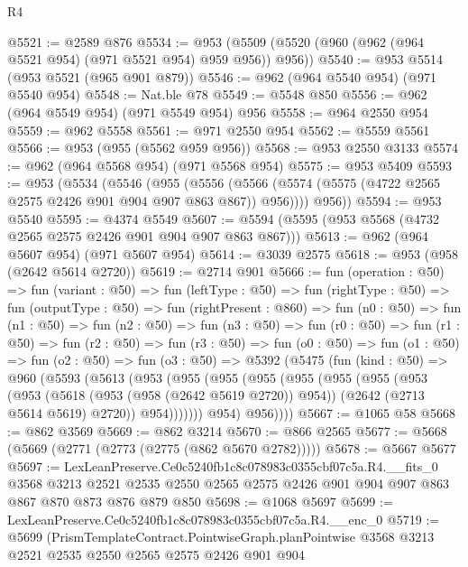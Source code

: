 \begin{lexlean}{R4}
\begin{coremodule}
@5521 := @2589 @876
@5534 := @953 (@5509 (@5520 (@960 (@962 (@964 @5521 @954) (@971 @5521 @954) @959 @956)) @956))
@5540 := @953 @5514 (@953 @5521 (@965 @901 @879))
@5546 := @962 (@964 @5540 @954) (@971 @5540 @954)
@5548 := Nat.ble @78
@5549 := @5548 @850
@5556 := @962 (@964 @5549 @954) (@971 @5549 @954) @956
@5558 := @964 @2550 @954
@5559 := @962 @5558
@5561 := @971 @2550 @954
@5562 := @5559 @5561
@5566 := @953 (@955 (@5562 @959 @956))
@5568 := @953 @2550 @3133
@5574 := @962 (@964 @5568 @954) (@971 @5568 @954)
@5575 := @953 @5409
@5593 := @953
    (@5534
      (@5546
        (@955
          (@5556 (@5566 (@5574 (@5575 (@4722 @2565 @2575 @2426 @901 @904 @907 @863 @867)) @956))))
        @956))
@5594 := @953 @5540
@5595 := @4374 @5549
@5607 := @5594 (@5595 (@953 @5568 (@4732 @2565 @2575 @2426 @901 @904 @907 @863 @867)))
@5613 := @962 (@964 @5607 @954) (@971 @5607 @954)
@5614 := @3039 @2575
@5618 := @953 (@958 (@2642 @5614 @2720))
@5619 := @2714 @901
@5666 := fun (operation : @50) =>
  fun (variant : @50) =>
  fun (leftType : @50) =>
  fun (rightType : @50) =>
  fun (outputType : @50) =>
  fun (rightPresent : @860) =>
  fun (n0 : @50) =>
  fun (n1 : @50) =>
  fun (n2 : @50) =>
  fun (n3 : @50) =>
  fun (r0 : @50) =>
  fun (r1 : @50) =>
  fun (r2 : @50) =>
  fun (r3 : @50) =>
  fun (o0 : @50) =>
  fun (o1 : @50) =>
  fun (o2 : @50) =>
  fun (o3 : @50) =>
  @5392
    (@5475
      (fun (kind : @50) =>
      @960
        (@5593
          (@5613
            (@953
              (@955
                (@955
                  (@955
                    (@955
                      (@955
                        (@955
                          (@953
                            (@953
                              (@5618 (@953 (@958 (@2642 @5619 @2720)) @954))
                              (@2642 (@2713 @5614 @5619) @2720))
                            @954)))))))
              @954)
            @956))))
@5667 := @1065 @58
@5668 := @862 @3569
@5669 := @862 @3214
@5670 := @866 @2565
@5677 := @5668 (@5669 (@2771 (@2773 (@2775 (@862 @5670 @2782)))))
@5678 := @5667 @5677
@5697 := LexLeanPreserve.Ce0c5240fb1c8c078983c0355cbf07c5a.R4.__fits_0
    @3568
    @3213
    @2521
    @2535
    @2550
    @2565
    @2575
    @2426
    @901
    @904
    @907
    @863
    @867
    @870
    @873
    @876
    @879
    @850
@5698 := @1068 @5697
@5699 := LexLeanPreserve.Ce0c5240fb1c8c078983c0355cbf07c5a.R4.__enc_0
@5719 := @5699
    (PrismTemplateContract.PointwiseGraph.planPointwise
      @3568
      @3213
      @2521
      @2535
      @2550
      @2565
      @2575
      @2426
      @901
      @904

\end{coremodule}
\end{lexlean}
